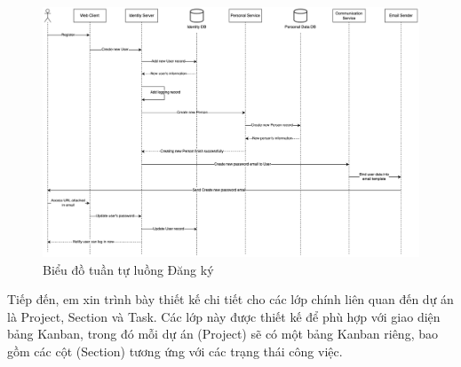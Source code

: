 \documentclass[../DoAn.tex]{subfiles}
\begin{document}
\begin{figure}[H]
    \centering
    \includegraphics[width=1.0\linewidth]{Hinhve/SequenceDiagram_Register.png}
    \caption{Biểu đồ tuần tự luồng Đăng ký}
    \label{fig:SequenceDiagram_Register}
\end{figure}

\newpage

Tiếp đến, em xin trình bày thiết kế chi tiết cho các lớp chính liên quan đến dự án là Project, Section và Task. Các lớp này được thiết
kế để phù hợp với giao diện bảng Kanban, trong đó mỗi dự án (Project) sẽ có một bảng Kanban riêng,
bao gồm các cột (Section) tương ứng với các trạng thái công việc.
\end{document}
